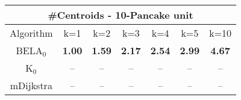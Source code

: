 \begin{tabular}{c|cccccc}\toprule
\multicolumn{7}{c}{#Centroids - 10-Pancake unit}\\ \midrule
Algorithm & k=1 & k=2 & k=3 & k=4 & k=5 & k=10 \\ \midrule
BELA$_0$ & \textbf{1.00} & \textbf{1.59} & \textbf{2.17} & \textbf{2.54} & \textbf{2.99} & \textbf{4.67} \\
K$_0$ & -- & -- & -- & -- & -- & -- \\
mDijkstra & -- & -- & -- & -- & -- & -- \\ \bottomrule 
\end{tabular}
